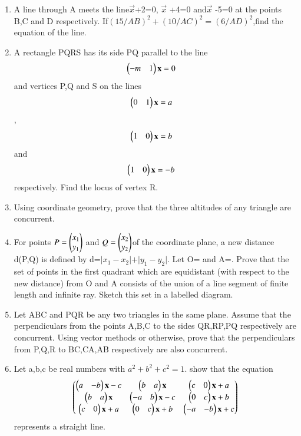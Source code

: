 \begin{enumerate}
    \item A line through A meets the line$\vec {x}$+2=0, $\vec {x}$ +4=0 and$\vec {x}$ -5=0 at the points B,C and D respectively. If$(15/AB)^2+(10/AC)^2=(6/AD)^2$,find the equation of the line.
    \item A rectangle PQRS has its side PQ parallel to the line \begin{align}\begin{pmatrix}-m & 1\end{pmatrix} \mathbf {x}  &= 0 \end{align} and vertices P,Q and S on the lines \begin{align}\begin{pmatrix}0 & 1\end{pmatrix} \mathbf {x}  &= a \end{align}, \begin{align}\begin{pmatrix}1 & 0\end{pmatrix} \mathbf {x}  &= b \end{align} and \begin{align}\begin{pmatrix}1 & 0\end{pmatrix} \mathbf {x}  &= -b \end{align} respectively. Find the locus of vertex R.
    \item Using coordinate geometry, prove that the three altitudes of any triangle are concurrent.
    \item For points $P=\begin{pmatrix}x_1\\y_1\end{pmatrix}$ and $Q=\begin{pmatrix}x_2\\y_2\end{pmatrix}$of the coordinate plane, a new distance d(P,Q) is defined by d=$\vert x_1-x_2\vert+ \vert y_1-y_2\vert$. Let O= and A=. Prove that the set of points in the first quadrant which are equidistant (with respect to the new distance) from O and A consists of the union of a line segment of finite length and infinite ray. Sketch this set in a labelled diagram.
    \item Let ABC and PQR be any two triangles in the same plane. Assume that the perpendiculars from the points A,B,C to the sides QR,RP,PQ respectively are concurrent. Using vector methods or otherwise, prove that the perpendiculars from P,Q,R to BC,CA,AB respectively are also concurrent.
    \item Let a,b,c be real numbers with $a^2+b^2+c^2=1$. show that the equation
    \begin{align}\begin{pmatrix}\begin{pmatrix}a & -b\end{pmatrix}\mathbf {x} - c & \begin{pmatrix}b & a\end{pmatrix}\mathbf {x} & \begin{pmatrix}c & 0\end{pmatrix}\mathbf {x} + a \\ \begin{pmatrix}b & a\end{pmatrix}\mathbf {x} &  \begin{pmatrix}-a & b\end{pmatrix}\mathbf {x} - c & \begin{pmatrix}0 & c\end{pmatrix}\mathbf {x} + b \\ \begin{pmatrix}c & 0\end{pmatrix}\mathbf {x} + a & \begin{pmatrix}0 & c\end{pmatrix}\mathbf {x} + b & \begin{pmatrix}-a & -b\end{pmatrix}\mathbf {x} + c\end{pmatrix} \end{align} represents a straight line.

\end{enumerate}
